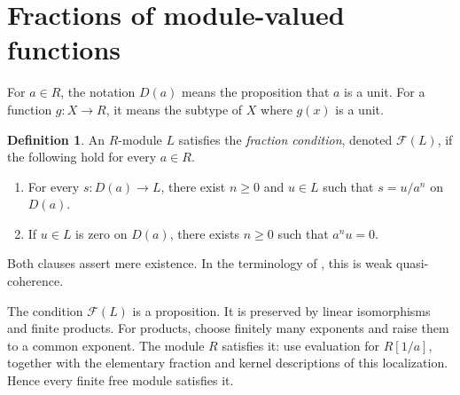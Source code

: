 \documentclass[11pt]{amsart}
\theoremstyle{definition}
\newtheorem{definition}[theorem]{Definition}
\newcommand{\Frac}{\mathcal F}
\begin{document}
\section{Fractions of module-valued functions}

For $a\in R$, the notation $D(a)$ means the proposition that $a$ is a
unit. For a function $g:X\to R$, it means the subtype of $X$ where
$g(x)$ is a unit.

\begin{definition}\label{def:fractions}
An $R$-module $L$ satisfies the \emph{fraction condition}, denoted
$\Frac(L)$, if the following hold for every $a\in R$.
\begin{enumerate}
\item For every $s:D(a)\to L$, there exist $n\geq0$ and $u\in L$ such
  that $s=u/a^n$ on $D(a)$.
\item If $u\in L$ is zero on $D(a)$, there exists $n\geq0$ such that
  $a^nu=0$.
\end{enumerate}
Both clauses assert mere existence. In the terminology of
\cite[Definition~7.1.5]{SAG}, this is weak quasi-coherence.
\end{definition}

The condition $\Frac(L)$ is a proposition. It is preserved by linear
isomorphisms and finite products. For products, choose finitely many
exponents and raise them to a common exponent.
The module $R$ satisfies it: use evaluation for $R[1/a]$, together with
the elementary fraction and kernel descriptions of this localization.
Hence every finite free module satisfies it.
\end{document}
